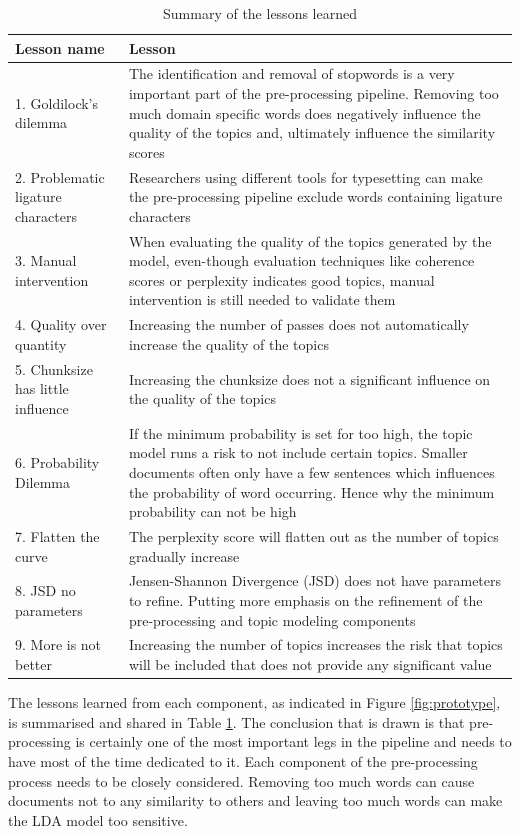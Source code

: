 \begin{table}[]
\begin{tabularx}{\textwidth}{|l|X|}
\hline
\textbf{Lesson name} & \textbf{Lesson} \\ \hline
1. Goldilock's dilemma & The identification and removal of stopwords is a very important part of the pre-processing pipeline. Removing too much domain specific words does negatively influence the quality of the topics and, ultimately influence the similarity scores \\ \hline
2. Problematic ligature characters & Researchers using different tools for typesetting can make the pre-processing pipeline exclude words containing ligature characters \\ \hline
3. Manual intervention & When evaluating the quality of the topics generated by the model, even-though evaluation techniques like coherence scores or perplexity indicates good topics, manual intervention is still needed to validate them \\ \hline
4. Quality over quantity & Increasing the number of passes does not automatically increase the quality of the topics \\ \hline
5. Chunksize has little influence & Increasing the chunksize does not a significant influence on the quality of the topics \\ \hline
6. Probability Dilemma & If the minimum probability is set for too high, the topic model runs a risk to not include certain topics. Smaller documents often only have a few sentences which influences the probability of word occurring. Hence why the minimum probability can not be high \\ \hline
7. Flatten the curve & The perplexity score will flatten out as the number of topics gradually increase \\ \hline
8. JSD no parameters & Jensen-Shannon Divergence (JSD) does not have parameters to refine. Putting more emphasis on the refinement of the pre-processing and topic modeling components \\ \hline
9. More is not better & Increasing the number of topics increases the risk that topics will be included that does not provide any significant value \\ \hline
\end{tabularx}
\caption{Summary of the lessons learned}
\label{tab:lessons}
\end{table}

The lessons learned from each component, as indicated in Figure \ref{fig:prototype}, is summarised and shared in Table \ref{tab:lessons}. The conclusion that is drawn is that pre-processing is certainly one of the most important legs in the pipeline and needs to have most of the time dedicated to it. Each component of the pre-processing process needs to be closely considered. Removing too much words can cause documents not to any similarity to others and leaving too much words can make the LDA model too sensitive.

